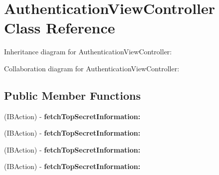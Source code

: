 \hypertarget{interface_authentication_view_controller}{
\section{\-Authentication\-View\-Controller \-Class \-Reference}
\label{interface_authentication_view_controller}
}


\-Inheritance diagram for \-Authentication\-View\-Controller\-:


\-Collaboration diagram for \-Authentication\-View\-Controller\-:
\subsection*{\-Public \-Member \-Functions}
\begin{DoxyCompactItemize}
\item 
\hypertarget{interface_authentication_view_controller_a4fc01d888638634b79f768deb5b84f83}{
(\-I\-B\-Action) -\/ {\bfseries fetch\-Top\-Secret\-Information\-:}}
\label{interface_authentication_view_controller_a4fc01d888638634b79f768deb5b84f83}

\item 
\hypertarget{interface_authentication_view_controller_a4fc01d888638634b79f768deb5b84f83}{
(\-I\-B\-Action) -\/ {\bfseries fetch\-Top\-Secret\-Information\-:}}
\label{interface_authentication_view_controller_a4fc01d888638634b79f768deb5b84f83}

\item 
\hypertarget{interface_authentication_view_controller_a4fc01d888638634b79f768deb5b84f83}{
(\-I\-B\-Action) -\/ {\bfseries fetch\-Top\-Secret\-Information\-:}}
\label{interface_authentication_view_controller_a4fc01d888638634b79f768deb5b84f83}

\item 
\hypertarget{interface_authentication_view_controller_a4fc01d888638634b79f768deb5b84f83}{
(\-I\-B\-Action) -\/ {\bfseries fetch\-Top\-Secret\-Information\-:}}
\label{interface_authentication_view_controller_a4fc01d888638634b79f768deb5b84f83}

\end{DoxyCompactItemize}
